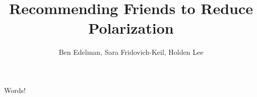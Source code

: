 \documentclass[12pt,letterpaper]{article}
\author{Ben Edelman, Sara Fridovich-Keil, Holden Lee}
\title{Recommending Friends to Reduce Polarization}
\begin{document}
\maketitle
Words!
\end{document}
